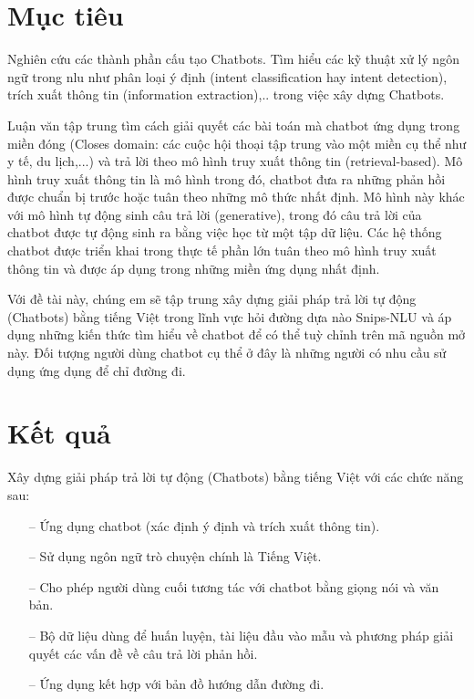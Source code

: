 \section{Mục tiêu}

Nghiên cứu các thành phần cấu tạo Chatbots. Tìm hiểu các kỹ thuật xử lý ngôn ngữ trong \ac{nlu} như phân loại ý định (intent classification hay intent detection), trích xuất thông tin (information extraction),.. trong việc xây dựng Chatbots.

Luận văn tập trung tìm cách giải quyết các bài toán mà chatbot ứng dụng trong miền đóng (Closes domain: các cuộc hội thoại tập trung vào một miền cụ thể như y tế, du lịch,...) và trả lời theo mô hình truy xuất thông tin (retrieval-based). Mô hình truy xuất thông tin là mô hình trong đó, chatbot đưa ra những phản hồi được chuẩn bị trước hoặc tuân theo những mô thức nhất định. Mô hình này khác với mô hình tự động sinh câu trả lời (generative), trong đó câu trả lời của chatbot được tự động sinh ra bằng việc học từ một tập dữ liệu. Các hệ thống chatbot được triển khai trong thực tế phần lớn tuân theo mô hình truy xuất thông tin và được áp dụng trong những miền ứng dụng nhất định.

Với đề tài này, chúng em sẽ tập trung xây dựng giải pháp trả lời tự động (Chatbots) bằng tiếng Việt trong lĩnh vực hỏi đường dựa nào Snips-NLU và áp dụng những kiến thức tìm hiểu về chatbot để có thể tuỳ chỉnh trên mã nguồn mở này. Đối tượng người dùng chatbot cụ thể ở đây là những người có nhu cầu sử dụng ứng dụng để chỉ đường đi. 

\section{Kết quả}
Xây dựng giải pháp trả lời tự động (Chatbots) bằng tiếng Việt với các chức năng sau:
\begin{itemize}
    \item[--] Ứng dụng chatbot (xác định ý định và trích xuất thông tin).
    \item[--] Sử dụng ngôn ngữ trò chuyện chính là Tiếng Việt.
    \item[--] Cho phép người dùng cuối tương tác với chatbot bằng giọng nói và văn bản.
    \item[--] Bộ dữ liệu dùng để huấn luyện, tài liệu đầu vào mẫu và phương pháp giải quyết các vấn đề về câu trả lời phản hồi.
    \item[--] Ứng dụng kết hợp với bản đồ hướng dẫn đường đi.
\end{itemize}



